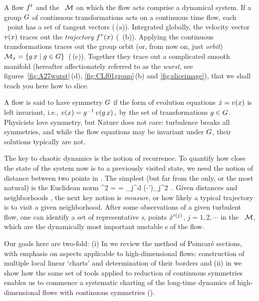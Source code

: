 A flow $f^t$ and the \statesp\ ${\cal M}$ on which the flow acts comprise a
{dynamical system}. If a group $G$ of continuous transformations
acts on a continuous time flow, each \statesp\ point has a set of
tangent vectors (\,(a)). Integrated globally, the
velocity vector $v(x)$ traces out the {\em trajectory}
${f^{\tau}(x)}$ ( \,(b)). Applying the continuous
transformations traces out the {group orbit} (or, from now on, just
\emph{orbit})
\(
{\cal M}_{x} = \{g\,x \mid g \in {\ensuremath{G}}\}
\,
\) %
(\,(c)). Together they trace out a complicated smooth
manifold (hereafter affectionately referred to as the {\em wurst}, see
figures~\ref{fig:A27wurst}\,(d), \ref{fig:CLf01group}\,(b) and
\ref{fig:sliceimage}), that we shall teach you here how to slice.

A flow is said to have symmetry $G$ if the form of evolution
equations $\dot{x} = v(x)$ is left invariant, i.e.,
\(
v(x)=g^{-1} \, v(g \, x)
\,,
\) %
by the set of transformations $g \in {\ensuremath{G}}$. Physicists love
symmetry, but Nature does not care: turbulence breaks all symmetries,
and while the flow equations may be invariant under $G$, their
solutions typically are not.

The key to chaotic dynamics is the notion of
recurrence. To quantify how close the state of the system now is to a previously visited
state, we need the notion of distance between two points in
\statesp. The simplest (but far from the only, or the most natural) is
the Euclidean norm
\beq
  ^2  =  =
\sum_j^d
(\ssp-\ssp')_j^2
\,.
Given distances and neighborhoods , the next key notion is  \emph{measure},
or how likely a typical trajectory is to visit a given neighborhood.
After some observations of a given turbulent flow, one can identify a set
of representative \emph{\template s}, {points}
${\hat{x}'}{}^{(j)}$, $j=1,2,\cdots$ in the \statesp\ ${\cal M}$, which are the
dynamically most important unstable {\recurrStr s} of the flow.

Our goals here are two-fold:
(i) In  we review the method of Poincar\'e sections, with
    emphasis on aspects applicable to high-dimensional flows: construction of
    multiple local linear `charts' and determination of their borders and
(ii) in  we show how the same set of tools applied to
    reduction of continuous symmetries enables us to commence a
    systematic charting of the long-time dynamics of high-dimensional
    flows with continuous symmetries ().

